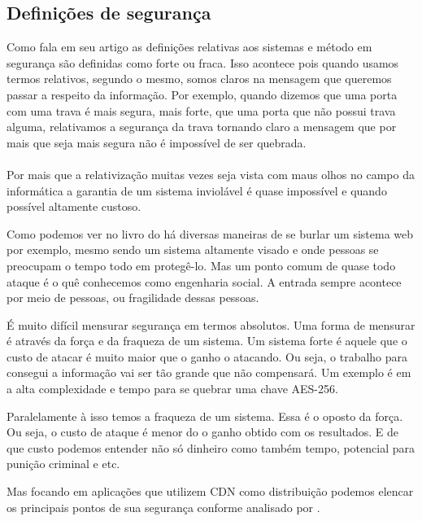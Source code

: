 \subsection{Defini\c{c}\~oes de seguran\c{c}a}
\label{subsection:definicoes_seguranca}
Como \cite{o2003comparing} fala em seu artigo as defini\c{c}\~oes relativas aos sistemas e m\'etodo em seguran\c{c}a s\~ao definidas como forte ou fraca. Isso acontece pois quando usamos termos relativos, segundo o mesmo, somos claros na mensagem que queremos passar a respeito da informa\c{c}\~ao. Por exemplo, quando dizemos que uma porta com uma trava \'e mais segura, mais forte, que uma porta que n\~ao possui trava alguma, relativamos a seguran\c{c}a da trava tornando claro a mensagem que por mais que seja mais segura n\~ao \'e imposs\'ivel de ser quebrada.
\paragraph{}
Por mais que a relativiza\c{c}\~ao muitas vezes seja vista com maus olhos no campo da inform\'atica a garantia de um sistema inviol\'avel \'e quase imposs\'ivel e quando poss\'ivel altamente custoso. 

Como podemos ver no livro do \cite{stuttard2011web} h\'a diversas maneiras de se burlar um sistema web por exemplo, mesmo sendo um sistema altamente visado e onde pessoas se preocupam o tempo todo em proteg\^e-lo. Mas um ponto comum de quase todo ataque \'e o qu\^e conhecemos como engenharia social. A entrada sempre acontece por meio de pessoas, ou fragilidade dessas pessoas.

\'E muito dif\'icil mensurar seguran\c{c}a em termos absolutos. Uma forma de mensurar \'e atrav\'es da for\c{c}a e da fraqueza de um sistema. Um sistema forte \'e aquele que o custo de atacar \'e muito maior que o ganho o atacando. Ou seja, o trabalho para consegui a informa\c{c}\~ao vai ser t\~ao grande que n\~ao compensar\'a. Um exemplo \'e em \cite{biryukov2010key} a alta complexidade e tempo para se quebrar uma chave AES-256.

Paralelamente \`a isso temos a fraqueza de um sistema. Essa \'e o oposto da for\c{c}a. Ou seja, o custo de ataque \'e menor do o ganho obtido com os resultados. E de que custo podemos entender n\~ao s\'o dinheiro como tamb\'em tempo, potencial para puni\c{c}\~ao criminal e etc.

Mas focando em aplica\c{c}\~oes que utilizem CDN como distribui\c{c}\~ao podemos elencar os principais pontos de sua seguran\c{c}a conforme analisado por \cite{pomelo2009analysis}.

